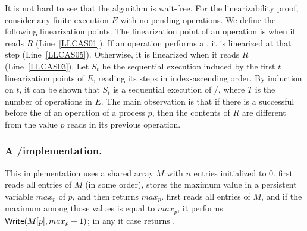 \begin{proofT}
  It is not hard to see that the algorithm is wait-free. For the linearizability proof, consider any finite execution $E$ with no pending operations. We define the following linearization points. The linearization point of an \LL operation is when it reads $R$ (Line~\ref{LLCAS01}). If an \IC operation performs a \CAS, it is linearized at that step (Line~\ref{LLCAS05}). Otherwise, it is linearized when it reads $R$ (Line~\ref{LLCAS03}). Let $S_t$ be the sequential execution induced by the first $t$ linearization points of $E$, reading its steps in index-ascending order. By induction on $t$, it can be shown that $S_t$ is a sequential execution of \LL/\IC, where $T$ is the number of operations in $E$. The main observation is that if there is a successful \CAS before the \CAS of an \IC operation of a process $p$, then the contents of $R$ are different from the value $p$ reads in its previous \LL operation.
\end{proofT}

\subsubsection{A \R/\W implementation.}
This implementation uses a shared array $M$ with $n$ entries initialized to 0.  \LL first reads all entries of $M$ (in some order), stores the maximum value in a persistent variable $max_p$ of $p$, and then returns $max_p$.  \IC first reads all entries of $M$, and if the maximum among those values is equal to $max_p$, it performs ${\sf Write}(M[p], max_p + 1)$; in any it case returns \ok.


